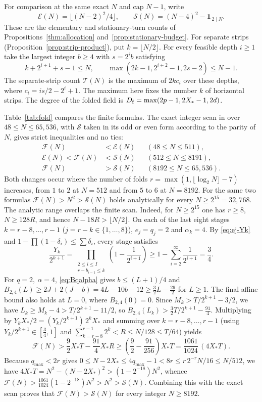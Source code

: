 For comparison at the same exact \(N\) and cap \(N-1\), write
\[
 \mathcal E(N)=\lfloor(N-2)^2/4\rfloor,\qquad
 \mathcal S(N)=(N-4)^2-\mathbf{1}_{\,2\mid N}.
\]
These are the elementary and stationary-turn counts of Propositions~\ref{thm:allocation} and~\ref{prop:stationary-budget}. For separate strips (Proposition~\ref{prop:strip-product}), put \(k=\lfloor N/2\rfloor\). For every feasible depth \(i\ge1\) take the largest integer \(b\ge4\) with \(s=2^i b\) satisfying
\[
 k+2^{i+1}+s-1\le N,\qquad
 \max(2k-1,2^{i+2}-1,2s-2)\le N-1 .
\]
The separate-strip count \(\mathcal T(N)\) is the maximum of \(2kc_i\) over these depths, where \(c_i=is/2-2^i+1\). The maximum here fixes the number \(k\) of horizontal strips. The degree of the folded field is \(D_{\rm f}=\max(2p-1,2X_*-1,2d)\).

Table~\ref{tab:fold} compares the finite formulas. The exact integer scan in \cite{LuReplay} over \(48\le N\le65{,}536\), with \(\mathcal S\) taken in its odd or even form according to the parity of \(N\), gives strict inequalities and no ties:
\begin{align*}
 \mathcal F(N)&<\mathcal E(N) &&(48\le N\le511),\\
 \mathcal E(N)<\mathcal F(N)&<\mathcal S(N) &&(512\le N\le8191),\\
 \mathcal F(N)&>\mathcal S(N) &&(8192\le N\le65{,}536).
\end{align*}
Both changes occur where the number of folds \(r=\max(1,\lfloor\log_2N\rfloor-7)\) increases, from \(1\) to \(2\) at \(N=512\) and from \(5\) to \(6\) at \(N=8192\). For the same two formulas \(\mathcal F(N)>N^2>\mathcal S(N)\) holds analytically for every \(N\ge 2^{15}=32{,}768\). The analytic range overlaps the finite scan. Indeed, for \(N\ge 2^{15}\) one has \(r\ge 8\), \(N\ge 128R\), and hence \(N-18R>\lfloor N/2\rfloor\). On each of the last eight stages \(k=r-8,\dots,r-1\) (\(j=r-k\in\{1,\dots,8\}\)), \(e_j=q_j=2\) and \(\alpha_k=4\). By \eqref{eq:ej-Yk} and \(1-\prod(1-\delta_i)\le\sum\delta_i\), every stage satisfies
\[
 \frac{Y_k}{2^{k+1}}
   = \prod_{\substack{2\le i\le I\\ r-b_{i-1}\le k}}\left(1-\frac{1}{2^{i+1}}\right)
   \ge 1-\sum_{i=2}^\infty\frac{1}{2^{i+1}} = \frac{3}{4}.
\]
For \(q=2,\ \alpha=4\), \eqref{eq:Bqalpha} gives \(b\le(L+1)/4\) and \(B_{2,4}(L)\ge 2J+2(J-b)=4L-10b-12\ge\tfrac{3}{2}L-\tfrac{29}{2}\) for \(L\ge1\). The final affine bound also holds at \(L=0\), where \(B_{2,4}(0)=0\). Since \(M_k>T/2^{k+1}-3/2\), we have \(L_k\ge M_k-4>T/2^{k+1}-11/2\), so \(B_{2,4}(L_k)>\tfrac{3}{2}T/2^{k+1}-\tfrac{91}{4}\). Multiplying by \(Y_k X_*/2=(Y_k/2^{k+1})\,2^k X_*\) and summing over \(k=r-8,\dots,r-1\) (using \(Y_k/2^{k+1}\in[\tfrac{3}{4},1]\) and \(\sum_{k=r-8}^{r-1}2^k<R\le N/128\le T/64\)) yields
\[
 \mathcal F(N)
   > \frac{9}{2}X_*T - \frac{91}{4}X_*R
   \ge \left(\frac{9}{2}-\frac{91}{256}\right)X_*T
   = \frac{1061}{1024}\,(4X_*T).
\]
Because \(q_{\max}<2r\) gives \(0\le N-2X_*\le 4q_{\max}-1<8r\le r\,2^{-r}N/16\le N/512\), we have \(4X_*T=N^2-(N-2X_*)^2>(1-2^{-18})N^2\), whence \(\mathcal F(N)>\frac{1061}{1024}(1-2^{-18})N^2>N^2>\mathcal S(N)\). Combining this with the exact scan proves that \(\mathcal F(N)>\mathcal S(N)\) for every integer \(N\ge 8192\).

